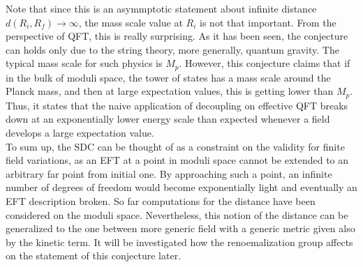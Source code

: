 Note that since this is an asymmptotic statement about infinite distance $d(R_{i}, R_{f}) \to \infty$, the mass scale value at $R_{i}$ is not that important. From the perspective of QFT, this is really surprising. As it has been seen, the conjecture can holds only due to the string theory, more generally, quantum gravity. The typical mass scale for such physics is $M_{p}$. However, this conjecture claims that if in the bulk of moduli space, the tower of states has a mass scale around the Planck mass, and then at large expectation values, this is getting lower than $M_{p}$. Thus, it states that the naive application of decoupling on effective QFT breaks down at an exponentially lower energy scale than expected whenever a field develops a large expectation value. \\
\indent To sum up, the SDC can be thought of as a constraint on the validity for finite field variations, as an EFT at a point in moduli space cannot be extended to an arbitrary far point from initial one. By approaching such a point, an infinite number of degrees of freedom would become exponentially light and eventually an EFT description broken. So far computations for the distance have been considered on the moduli space. Nevertheless, this notion of the distance can be generalized to the one between more generic field with a generic metric given also by the kinetic term. It will be investigated how the renoemalization group affects on the statement of this conjecture later. 
